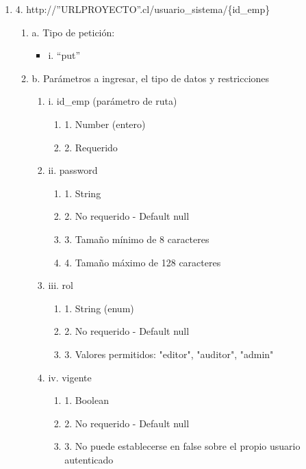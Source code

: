 \begin{enumerate}
    \item 4. http://”URLPROYECTO”.cl/usuario\_sistema/\{id\_emp\}
    \begin{enumerate}
        \item a. Tipo de petición:
            \begin{itemize}
               \item i. “put”
            \end{itemize}
        \item b. Parámetros a ingresar, el tipo de datos y restricciones
            \begin{enumerate}
                \item i. id\_emp (parámetro de ruta)
                    \begin{enumerate}
                        \item 1. Number (entero)
                        \item 2. Requerido
                    \end{enumerate}
                \item ii. password
                    \begin{enumerate}
                        \item 1. String
                        \item 2. No requerido - Default null
                        \item 3. Tamaño mínimo de 8 caracteres
                        \item 4. Tamaño máximo de 128 caracteres
                    \end{enumerate}
                \item iii. rol
                    \begin{enumerate}
                        \item 1. String (enum)
                        \item 2. No requerido - Default null
                        \item 3. Valores permitidos: "editor", "auditor", "admin"
                    \end{enumerate}
                \item iv. vigente
                    \begin{enumerate}
                        \item 1. Boolean
                        \item 2. No requerido - Default null
                        \item 3. No puede establecerse en false sobre el propio usuario autenticado
                    \end{enumerate}
            \end{enumerate}
    \end{enumerate}


\end{enumerate}
